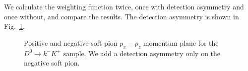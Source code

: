 \documentclass{article}
\begin{document}
        We calculate the weighting function twice, once with detection asymmetry and once without, and compare the results.
        The detection asymmetry is shown in Fig.~\ref{fig:detection}.
        \begin{figure}[h!]
                \centering
                \caption{Positive and negative soft pion $p_x - p_z$ momentum plane for the $D^0\to k^-K^+$ sample. We add a detection asymmetry only on the negative soft pion.}
                \label{fig:detection}
        \end{figure}
\end{document}

